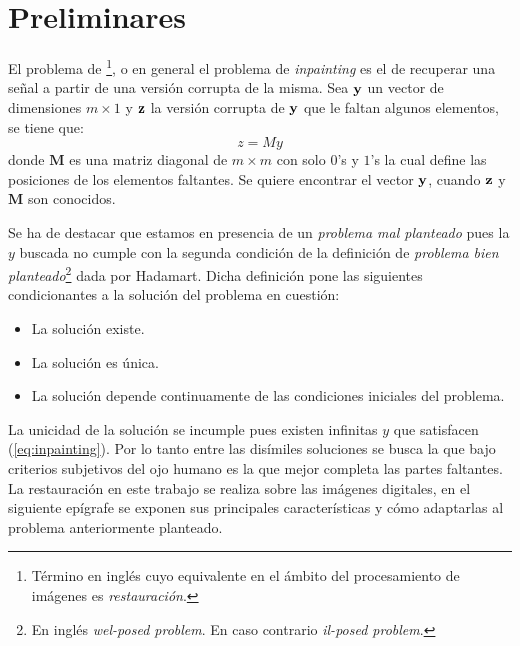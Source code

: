 \chapter{Preliminares}\label{chapter:background}

\begin{definition}\label{def:inpainting}
	El problema de \II\footnote{T\'ermino en ingl\'es cuyo equivalente en el \'ambito del procesamiento de im\'agenes es \textit{restauraci\'on}.}, o en general el problema de \textit{inpainting} es el de recuperar una señal a partir de una versi\'on corrupta de la misma. Sea $\mathbf{y}$ un vector de dimensiones $m \times 1$ y $\mathbf{z}$ la versi\'on corrupta de $\mathbf{y}$ que le faltan algunos elementos, se tiene que:
	\begin{equation}
		z = My
		\label{eq:inpainting}
	\end{equation}
	donde $\mathbf{M}$ es una matriz diagonal de $m \times m$ con solo $0$'s y $1$'s la cual define las posiciones de los elementos faltantes. Se quiere encontrar el vector $\mathbf{y}$, cuando $\mathbf{z}$ y  $\mathbf{M}$ son conocidos. 
\end{definition}

Se ha de destacar que estamos en presencia de un \textit{problema mal planteado} pues la $y$ buscada no cumple con la segunda condición de la definición de \textit{problema bien planteado}\footnote{En ingl\'es \textit{wel-posed problem}. En caso contrario \textit{il-posed problem}.} \cite{enwiki:wpp} dada por Hadamart. Dicha definición pone las siguientes condicionantes a la soluci\'on  del problema en cuestión:
\begin{itemize}
	\item La soluci\'on existe.
	\item La soluci\'on es \'unica.
	\item La soluci\'on depende continuamente de las condiciones iniciales del problema.
\end{itemize}
La unicidad de la soluci\'on se incumple pues existen infinitas $y$ que satisfacen (\ref{eq:inpainting}). Por lo tanto entre las dis\'imiles soluciones se busca la que bajo criterios subjetivos del ojo humano es la que mejor completa las partes faltantes. La restauraci\'on en este trabajo se realiza sobre las im\'agenes digitales, en el siguiente ep\'igrafe se exponen sus principales características y c\'omo adaptarlas al problema anteriormente planteado. 

